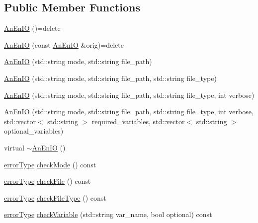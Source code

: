 \subsection*{Public Member Functions}
\begin{DoxyCompactItemize}
\item 
\mbox{\hyperlink{class_an_en_i_o_a199f4cd2569599820126ae27ec25a647}{An\+En\+IO}} ()=delete
\item 
\mbox{\hyperlink{class_an_en_i_o_ab3dc8be2a5d7034cccd35ed72ee41275}{An\+En\+IO}} (const \mbox{\hyperlink{class_an_en_i_o}{An\+En\+IO}} \&orig)=delete
\item 
\mbox{\hyperlink{class_an_en_i_o_ae6c32e309a740b6680e997728b3636a3}{An\+En\+IO}} (std\+::string mode, std\+::string file\+\_\+path)
\item 
\mbox{\hyperlink{class_an_en_i_o_a7556c5e1e44c8d7eeec5dfc93467a91d}{An\+En\+IO}} (std\+::string mode, std\+::string file\+\_\+path, std\+::string file\+\_\+type)
\item 
\mbox{\hyperlink{class_an_en_i_o_a7c97d67357f729e50fc6e0d90fef9e36}{An\+En\+IO}} (std\+::string mode, std\+::string file\+\_\+path, std\+::string file\+\_\+type, int verbose)
\item 
\mbox{\hyperlink{class_an_en_i_o_ac040fa1dad19178f28b719f247e11b0d}{An\+En\+IO}} (std\+::string mode, std\+::string file\+\_\+path, std\+::string file\+\_\+type, int verbose, std\+::vector$<$ std\+::string $>$ required\+\_\+variables, std\+::vector$<$ std\+::string $>$ optional\+\_\+variables)
\item 
virtual \mbox{\hyperlink{class_an_en_i_o_a1e7aef95fd2a0c6aaef55998f48368f4}{$\sim$\+An\+En\+IO}} ()
\item 
\mbox{\hyperlink{class_an_en_i_o_aa56bc1ec6610b86db4349bce20f9ead0}{error\+Type}} \mbox{\hyperlink{class_an_en_i_o_a2dbb61800810628c09158882d3727478}{check\+Mode}} () const
\item 
\mbox{\hyperlink{class_an_en_i_o_aa56bc1ec6610b86db4349bce20f9ead0}{error\+Type}} \mbox{\hyperlink{class_an_en_i_o_adf0b96d441687159e1d884273847d68e}{check\+File}} () const
\item 
\mbox{\hyperlink{class_an_en_i_o_aa56bc1ec6610b86db4349bce20f9ead0}{error\+Type}} \mbox{\hyperlink{class_an_en_i_o_aa9b4700db58d0ef09af429d5d31ff55f}{check\+File\+Type}} () const
\item 
\mbox{\hyperlink{class_an_en_i_o_aa56bc1ec6610b86db4349bce20f9ead0}{error\+Type}} \mbox{\hyperlink{class_an_en_i_o_ab7f3ba245b7acb11184e0a5b3490a84b}{check\+Variable}} (std\+::string var\+\_\+name, bool optional) const

\end{DoxyCompactItemize}
